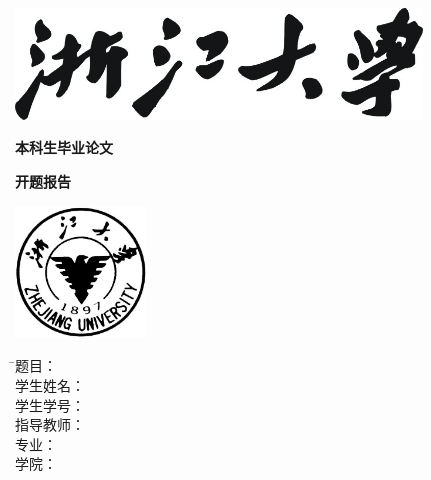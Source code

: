 
\thispagestyle{empty}

\vspace{5mm}

\begin{center}
   \includegraphics[width=108mm]{images/zjdx}
\end{center}

\centerline{\songti\xiaoyi\textbf{本科生毕业论文}}
\centerline{\songti\xiaoyi\textbf{开题报告}}
\vspace{4mm}

\begin{center}
  \includegraphics[width=35mm]{images/standxb}
\end{center}

\vspace{32mm}

\begin{tabbing}
			   \hspace{25mm} \= \songti\sihao 题\hspace{10mm}目： \= \underline{\makebox[8cm]{\sihao\zjutitlec}} \\[2mm]
               \> \songti\sihao 学生姓名： \= \underline{\makebox[8cm]{\sihao\zjuauthornamec}} \\[2mm]
              \> \songti\sihao 学生学号： \> \underline{\makebox[8cm]{\sihao\zjuauthorid}} \\[2mm]
              \> \songti\sihao 指导教师： \> \underline{\makebox[8cm]{\sihao\zjumentorc}} \\[2mm]
              \> \songti\sihao 专\hspace{10mm}业： \> \underline{\makebox[8cm]{\sihao\zjugrade\hspace{3mm}\zjumajor}} \\[2mm]
              \> \songti\sihao 学\hspace{10mm}院： \> \underline{\makebox[8cm]{\sihao\zjucollegec}}
\end{tabbing}


